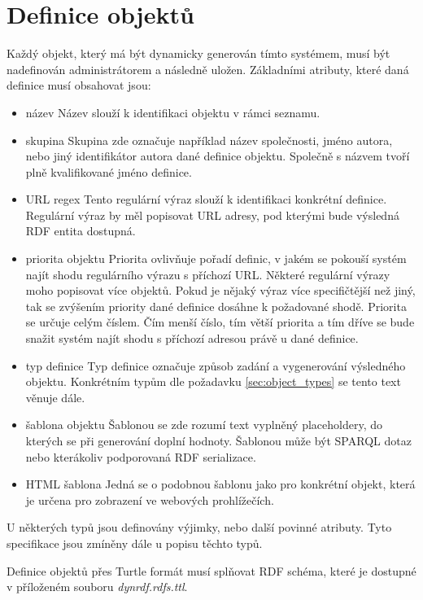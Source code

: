 \documentclass[thesis=B,czech]{FITthesis}[2012/06/26]
\begin{document}
 \section{Definice objektů}\label{obj_def}
  Každý objekt, který má být dynamicky generován tímto systémem, musí být nadefinován administrátorem a následně uložen.
  Základními atributy, které daná definice musí obsahovat jsou:
  \begin{itemize}
    \item název
      \subitem Název slouží k identifikaci objektu v rámci seznamu.
    \item skupina
      \subitem Skupina zde označuje například název společnosti, jméno autora, nebo jiný identifikátor autora dané definice objektu. 
      Společně s názvem tvoří plně kvalifikované jméno definice.
    \item URL regex
      \subitem Tento regulární výraz slouží k identifikaci konkrétní definice. Regulární výraz by měl popisovat URL adresy, pod kterými bude výsledná RDF entita
      dostupná.
    \item priorita objektu
      \subitem Priorita ovlivňuje pořadí definic, v jakém se pokouší systém najít shodu regulárního výrazu s příchozí URL. Některé regulární
      výrazy moho popisovat více objektů. Pokud je nějaký výraz více specifičtější než jiný, tak se zvýšením priority dané definice dosáhne k požadované shodě.
      Priorita se určuje celým číslem. Čím menší číslo, tím větší priorita a tím dříve se bude snažit systém najít shodu s příchozí adresou právě u dané definice.
      
    \item typ definice
      \subitem Typ definice označuje způsob zadání a vygenerování výsledného objektu. Konkrétním typům dle požadavku \ref{sec:object_types} se tento text věnuje dále.
    \item šablona objektu
      \subitem Šablonou se zde rozumí text vyplněný placeholdery, do kterých se při generování doplní hodnoty. Šablonou může být SPARQL dotaz nebo kterákoliv 
      podporovaná RDF serializace.
      
    \item HTML šablona
      \subitem Jedná se o podobnou šablonu jako pro konkrétní objekt, která je určena pro zobrazení ve webových prohlížečích.    
 \end{itemize}
 U některých typů jsou definovány výjimky, nebo další povinné atributy. Tyto specifikace jsou zmíněny dále u popisu těchto typů.
 
 Definice objektů přes Turtle formát musí splňovat RDF schéma, které je dostupné v příloženém souboru \textit{dynrdf.rdfs.ttl}.
 
\end{document}
